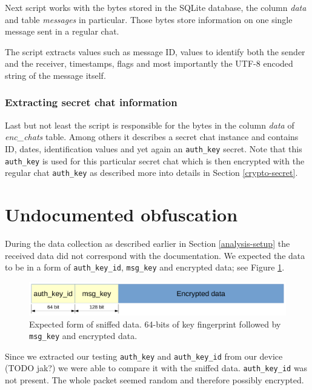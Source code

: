 \documentclass[thesis=M,english]{FITthesis}[2012/10/20]
\begin{document}
Next script  works with the bytes stored in the SQLite database, the column \emph{data} and table \emph{messages} in particular. Those bytes store information on one single message sent in a regular chat.

The script extracts values such as message ID, values to identify both the sender and the receiver, timestamps, flags and most importantly the UTF-8 encoded string of the message itself.

\subsubsection{Extracting secret chat information}

Last but not least the  script is responsible for the bytes in the column \emph{data} of \emph{enc\_chats} table. Among others it describes a secret chat instance and contains ID, dates, identification values and yet again an \texttt{auth\_key} secret. Note that this \texttt{auth\_key} is used for this particular secret chat which is then encrypted with the regular chat \texttt{auth\_key} as described more into details in Section \ref{crypto-secret}.

\section{Undocumented obfuscation}\label{analysis-obf}

During the data collection as described earlier in Section \ref{analysis-setup} the received data did not correspond with the documentation. We expected the data to be in a form of \texttt{auth\_key\_id}, \texttt{msg\_key} and encrypted data; see Figure \ref{img:analysis-obf-expected}.

\begin{figure}[htb]
	\centering
	\includegraphics[width=1\textwidth]{sniffed-expected.pdf}
	\caption{Expected form of sniffed data. 64-bits of key fingerprint followed by \texttt{msg\_key} and encrypted data.}
	\label{img:analysis-obf-expected}
\end{figure}

Since we extracted our testing \texttt{auth\_key} and \texttt{auth\_key\_id} from our device (TODO jak?) we were able to compare it with the sniffed data. \texttt{auth\_key\_id} was not present. The whole packet seemed random and therefore possibly encrypted.
\end{document}
